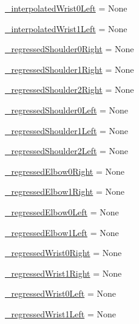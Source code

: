 \begin{DoxyCompactItemize}
\item 
\mbox{\hyperlink{namespacesteering__simulation_a89100082be780423ef8cb32970fb1719}{\+\_\+interpolated\+Wrist0\+Left}} = None
\item 
\mbox{\hyperlink{namespacesteering__simulation_a044a88f1d8e7442e56c31647186fd626}{\+\_\+interpolated\+Wrist1\+Left}} = None
\item 
\mbox{\hyperlink{namespacesteering__simulation_a9c00f2252bbdc56a767e0dd14244a172}{\+\_\+regressed\+Shoulder0\+Right}} = None
\item 
\mbox{\hyperlink{namespacesteering__simulation_a31e0576d19447bee4b24729459ff4b94}{\+\_\+regressed\+Shoulder1\+Right}} = None
\item 
\mbox{\hyperlink{namespacesteering__simulation_aeec070bce57c67b666f5ebdbae1e27de}{\+\_\+regressed\+Shoulder2\+Right}} = None
\item 
\mbox{\hyperlink{namespacesteering__simulation_a4203655e78045f63c997316cc5c351e4}{\+\_\+regressed\+Shoulder0\+Left}} = None
\item 
\mbox{\hyperlink{namespacesteering__simulation_a7c1b938e9f72b1f50694edd164cb8419}{\+\_\+regressed\+Shoulder1\+Left}} = None
\item 
\mbox{\hyperlink{namespacesteering__simulation_a421efc578e81ec549903721c34847cd8}{\+\_\+regressed\+Shoulder2\+Left}} = None
\item 
\mbox{\hyperlink{namespacesteering__simulation_a9051de1d3ca856247286471428f4904a}{\+\_\+regressed\+Elbow0\+Right}} = None
\item 
\mbox{\hyperlink{namespacesteering__simulation_a8a1973e968c7a7cd522fa01b6bdcc708}{\+\_\+regressed\+Elbow1\+Right}} = None
\item 
\mbox{\hyperlink{namespacesteering__simulation_a6578ba913df0e70ad8bac370b2487690}{\+\_\+regressed\+Elbow0\+Left}} = None
\item 
\mbox{\hyperlink{namespacesteering__simulation_a9abb832a963446f645e9e2ef1c27c7bd}{\+\_\+regressed\+Elbow1\+Left}} = None
\item 
\mbox{\hyperlink{namespacesteering__simulation_a1c654b15f1b8ea91b2997bd5de4f8b9d}{\+\_\+regressed\+Wrist0\+Right}} = None
\item 
\mbox{\hyperlink{namespacesteering__simulation_a39e4eb08bba548e27a24df3b40a96c48}{\+\_\+regressed\+Wrist1\+Right}} = None
\item 
\mbox{\hyperlink{namespacesteering__simulation_a99abea20d1f4b510dd4dfb589201b963}{\+\_\+regressed\+Wrist0\+Left}} = None
\item 
\mbox{\hyperlink{namespacesteering__simulation_aa295ffef98b1c03490f0cac204d3d7f1}{\+\_\+regressed\+Wrist1\+Left}} = None

\end{DoxyCompactItemize}
